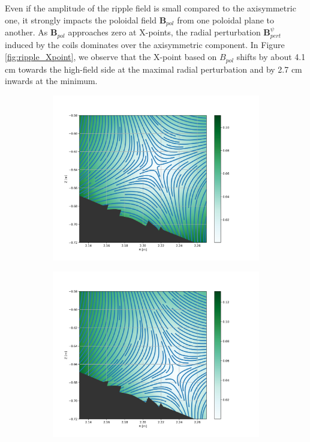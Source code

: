 Even if the amplitude of the ripple field is small compared to the axisymmetric one, it strongly impacts the poloidal field $\textbf{B}_{pol}$ from one poloidal plane to another. As $\textbf{B}_{pol}$ approaches zero at X-points, the radial perturbation $\textbf{B}_{pert}^{\psi}$ induced by the coils dominates over the axisymmetric component. In Figure \ref{fig:ripple_Xpoint}, we observe that the X-point based on $B_{pol}$ shifts by about 4.1 cm towards the high-field side at the maximal radial perturbation and by 2.7 cm inwards at the minimum. \newline 


\begin{figure}[H]\centering
	\begin{subfigure}[t]{0.43\textwidth}
		\centering
		\includegraphics[width=1\textwidth]{schemes/rippleStreamlines_phi1.png}
		\label{fig:ripple_Xpoint_phi1}
	\end{subfigure}
	\begin{subfigure}[t]{0.43\textwidth}
		\centering
		\includegraphics[width=1\textwidth]{schemes/rippleStreamlines_phi2.png}

\end{subfigure}
\end{figure}
